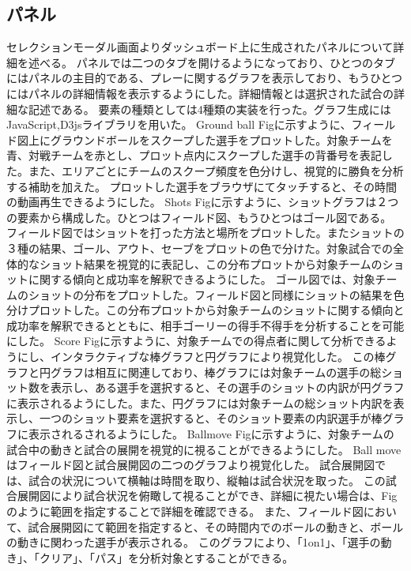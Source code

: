 \documentclass[sotsuron]{kuee}
\begin{document}
		\subsection{パネル}
			セレクションモーダル画面よりダッシュボード上に生成されたパネルについて詳細を述べる。
			パネルでは二つのタブを開けるようになっており、ひとつのタブにはパネルの主目的である、プレーに関するグラフを表示しており、もうひとつにはパネルの詳細情報を表示するようにした。詳細情報とは選択された試合の詳細な記述である。
			要素の種類としては4種類の実装を行った。グラフ生成にはJavaScript,D3jsライブラリを用いた。
			Ground ball
			Figに示すように、フィールド図上にグラウンドボールをスクープした選手をプロットした。対象チームを青、対戦チームを赤とし、プロット点内にスクープした選手の背番号を表記した。また、エリアごとにチームのスクープ頻度を色分けし、視覚的に勝負を分析する補助を加えた。
			プロットした選手をブラウザにてタッチすると、その時間の動画再生できるようにした。
			Shots
			Figに示すように、ショットグラフは２つの要素から構成した。ひとつはフィールド図、もうひとつはゴール図である。
			フィールド図ではショットを打った方法と場所をプロットした。またショットの３種の結果、ゴール、アウト、セーブをプロットの色で分けた。対象試合での全体的なショット結果を視覚的に表記し、この分布プロットから対象チームのショットに関する傾向と成功率を解釈できるようにした。
			ゴール図では、対象チームのショットの分布をプロットした。フィールド図と同様にショットの結果を色分けプロットした。この分布プロットから対象チームのショットに関する傾向と成功率を解釈できるとともに、相手ゴーリーの得手不得手を分析することを可能にした。
			Score
			Figに示すように、対象チームでの得点者に関して分析できるようにし、インタラクティブな棒グラフと円グラフにより視覚化した。
			この棒グラフと円グラフは相互に関連しており、棒グラフには対象チームの選手の総ショット数を表示し、ある選手を選択すると、その選手のショットの内訳が円グラフに表示されるようにした。また、円グラフには対象チームの総ショット内訳を表示し、一つのショット要素を選択すると、そのショット要素の内訳選手が棒グラフに表示されるされるようにした。
			Ballmove
			Figに示すように、対象チームの試合中の動きと試合の展開を視覚的に視ることができるようにした。
			Ball moveはフィールド図と試合展開図の二つのグラフより視覚化した。
			試合展開図では、試合の状況について横軸は時間を取り、縦軸は試合状況を取った。
			この試合展開図により試合状況を俯瞰して視ることができ、詳細に視たい場合は、Figのように範囲を指定することで詳細を確認できる。
			また、フィールド図において、試合展開図にて範囲を指定すると、その時間内でのボールの動きと、ボールの動きに関わった選手が表示される。
			このグラフにより、「1on1」、「選手の動き」、「クリア」、「パス」を分析対象とすることができる。
\end{document}
